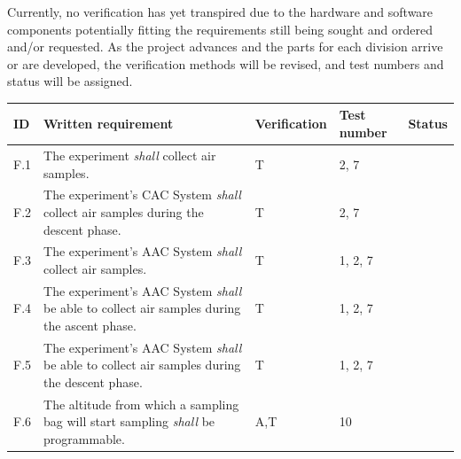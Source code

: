 \documentclass[a4paper,12pt,twoside]{article}
\begin{document}
Currently, no verification has yet transpired due to the hardware and software components potentially fitting the requirements still being sought and ordered and/or requested. As the project advances and the parts for each division arrive or are developed, the verification methods will be revised, and test numbers and status will be assigned.

\makeatletter
\renewcommand\@makefntext[1]{\leftskip=3em\hskip-1em\@makefnmark#1}
\makeatother

\begin{longtable}[]{|m{}| m{} |m{} |m{}|m{}|}

\hline
ID   & Written requirement                                                                                                                                                     & Verification & Test number & Status \\ \hline
F.1  & The experiment \textit{shall} collect air samples.                                                                                                                               &      T        &  2, 7           &        \\ \hline
F.2  & The experiment's CAC System \textit{shall} collect air samples during the descent phase.                                                                                         &      T        &  2, 7           &        \\ \hline
F.3  & The experiment's AAC System \textit{shall} collect air samples.                                                                                                                  &     T         &  1, 2, 7           &        \\ \hline
F.4  & The experiment's AAC System \textit{shall} be able to collect air samples during the ascent phase.                                                                               &     T         & 1, 2, 7     &        \\ \hline
F.5  & The experiment's AAC System \textit{shall} be able to collect air samples during the descent phase.                                                                              &      T        & 1, 2, 7    &        \\ \hline
F.6  & The altitude from which a sampling bag will start sampling \textit{shall} be programmable.                                                                                       &     A,T         &  10           &        \\ \hline

\end{longtable}
\end{document}
